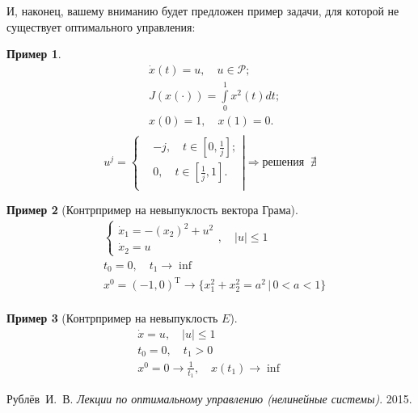 \documentclass[oneside, final, 14pt, draft]{article}
\theoremstyle{definition}
\newtheorem{ex}{Пример}[section]
\theoremstyle{definition}
\theoremstyle{remark}
\theoremstyle{theorem}
\renewcommand{\leq}{\leqslant}
\begin{document}
И, наконец, вашему вниманию будет предложен пример задачи, для которой не существует оптимального управления:
\begin{ex}
$$
\begin{aligned}
    &\dot{x}(t) = u, \quad u \in \mathcal{P};\\
    &J(x(\cdot)) = \int\limits_0^1 x^2(t) dt;\\
    &x(0) = 1, \quad x(1) = 0.\\
\end{aligned}
$$
$$
u^j = 
\left\{ 
\begin{aligned}
& -j, \quad t \in \left[0, \frac{1}{j}\right]; \\
& 0, \quad t \in \left[\frac{1}{j}, 1\right]. \\
\end{aligned}
\right| \Rightarrow \text{решения } \ \nexists
$$
\end{ex}
\begin{ex}[Контрпример на невыпуклость вектора Грама]
\begin{align*}
&\begin{cases}
\dot{x}_1 = -(x_2)^2 + u^2\\
\dot{x}_2 = u
\end{cases},\quad |u| \leq 1\\
&t_0 = 0,\quad t_1 \rightarrow \inf\\
&x^0 = (-1,0)^\mathrm{T} \rightarrow \{x_1^2+x_2^2 = a^2 \,|\, 0<a<1 \}\\
\end{align*}
\end{ex}

\begin{ex}[Контрпример на невыпуклость $E$]
\begin{gather*}
\dot{x} = u,\quad |u| \leq 1\\
t_0 = 0,\quad t_1 > 0\\
x^0 = 0 \rightarrow \frac{1}{t_1},\quad x(t_1) \rightarrow \inf
\end{gather*}
\end{ex}
\newpage
\begin{thebibliography}{0}
   Рублёв~И.~В. \emph{Лекции по оптимальному управлению (нелинейные системы)}. 2015.
\end{thebibliography}
\end{document}
